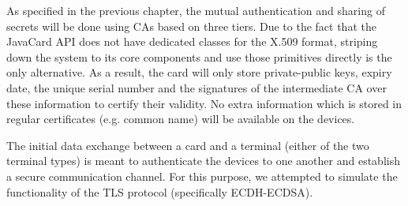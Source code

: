 As specified in the previous chapter, the mutual authentication and sharing of secrets will be done using CAs based on three tiers. Due to the fact that the JavaCard API does not have dedicated classes for the X.509 format, striping down the system to its core components and use those primitives directly is the only alternative. As a result, the card will only store private-public keys, expiry date, the unique serial number and the signatures of the intermediate CA over these information to certify their validity. No extra information which is stored in regular certificates (e.g. common name) will be available on the devices.

The initial data exchange between a card and a terminal (either of the two terminal types) is meant to authenticate the devices to one another and establish a secure communication channel. For this purpose, we attempted to simulate the functionality of the TLS protocol (specifically ECDH-ECDSA). 

